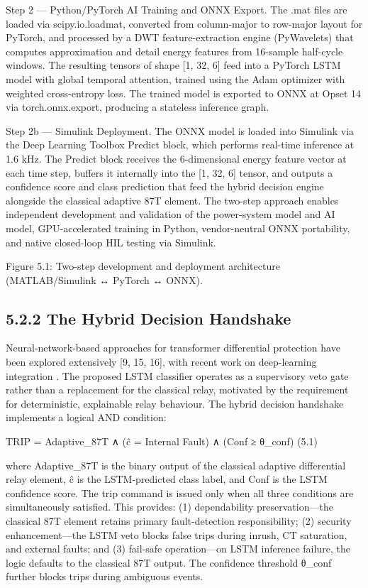 Step 2 --- Python/PyTorch AI Training and ONNX Export. The .mat files are loaded via scipy.io.loadmat, converted from column-major to row-major layout for PyTorch, and processed by a DWT feature-extraction engine (PyWavelets) that computes approximation and detail energy features from 16-sample half-cycle windows. The resulting tensors of shape [1, 32, 6] feed into a PyTorch LSTM model with global temporal attention, trained using the Adam optimizer with weighted cross-entropy loss. The trained model is exported to ONNX at Opset 14 via torch.onnx.export, producing a stateless inference graph.

Step 2b --- Simulink Deployment. The ONNX model is loaded into Simulink via the Deep Learning Toolbox Predict block, which performs real-time inference at 1.6 kHz. The Predict block receives the 6-dimensional energy feature vector at each time step, buffers it internally into the [1, 32, 6] tensor, and outputs a confidence score and class prediction that feed the hybrid decision engine alongside the classical adaptive 87T element. The two-step approach enables independent development and validation of the power-system model and AI model, GPU-accelerated training in Python, vendor-neutral ONNX portability, and native closed-loop HIL testing via Simulink.

Figure 5.1: Two-step development and deployment architecture (MATLAB/Simulink ↔ PyTorch ↔ ONNX).


\subsection{5.2.2  The Hybrid Decision Handshake}
Neural-network-based approaches for transformer differential protection have been explored extensively [9, 15, 16], with recent work on deep-learning integration \cite{ref3, ref23}. The proposed LSTM classifier operates as a supervisory veto gate rather than a replacement for the classical relay, motivated by the requirement for deterministic, explainable relay behaviour. The hybrid decision handshake implements a logical AND condition:

TRIP = Adaptive\_87T ∧ (ĉ = Internal Fault) ∧ (Conf ≥ θ\_conf)	(5.1)

where Adaptive\_87T is the binary output of the classical adaptive differential relay element, ĉ is the LSTM-predicted class label, and Conf is the LSTM confidence score. The trip command is issued only when all three conditions are simultaneously satisfied. This provides: (1) dependability preservation---the classical 87T element retains primary fault-detection responsibility; (2) security enhancement---the LSTM veto blocks false trips during inrush, CT saturation, and external faults; and (3) fail-safe operation---on LSTM inference failure, the logic defaults to the classical 87T output. The confidence threshold θ\_conf further blocks trips during ambiguous events.

